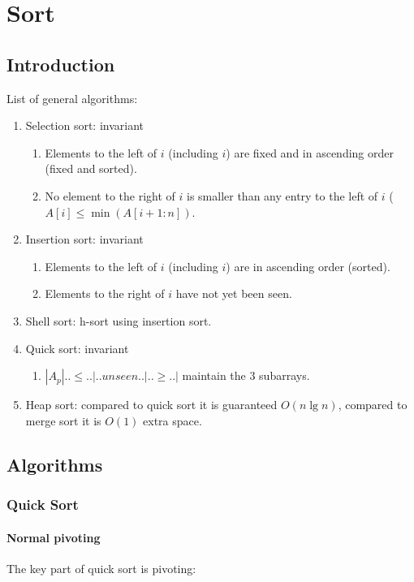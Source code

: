 \chapter{Sort}


\section{Introduction}
List of general algorithms:
\begin{enumerate}
\item Selection sort: invariant
\begin{enumerate}
\item Elements to the left of $i$ (including $i$) are fixed and in ascending order (fixed and sorted).
\item No element to the right of $i$ is smaller than any entry to the left of $i$ ($A[i]  \leq\min(A[i+1:n])$.
\end{enumerate}
\item Insertion sort: invariant
\begin{enumerate}
\item Elements to the left of $i$ (including $i$) are in ascending order (sorted).
\item Elements to the right of $i$ have not yet been seen.
\end{enumerate}
\item Shell sort: h-sort using insertion sort.
\item Quick sort: invariant
\begin{enumerate}
\item $|A_p|..\leq..|..unseen..|..\geq..|$ maintain the 3 subarrays.
\end{enumerate}
\item Heap sort: compared to quick sort it is guaranteed $O(n \lg n)$, compared to merge sort it is $O(1)$ extra space. 
\end{enumerate}

\section{Algorithms}
\subsection{Quick Sort}
\subsubsection{Normal pivoting}\label{section:pivot}
The key part of quick sort is pivoting:


